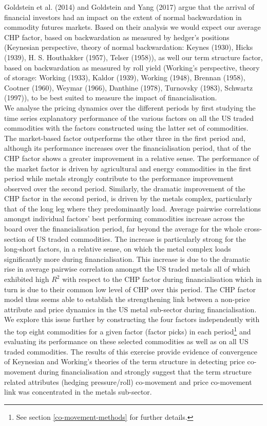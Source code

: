 \documentclass[]{elsarticle} %
\begin{document}
Goldstein et al. (2014) and Goldstein and Yang (2017) argue that the arrival of financial investors had an impact on the extent of normal backwardation in commodity futures markets. Based on their analysis we would expect our average CHP factor, based on backwardation as measured by hedger's positions (Keynesian perspective, theory of normal backwardation: Keynes (1930), Hicks (1939), H. S. Houthakker (1957), Telser (1958)), as well our term structure factor, based on backwardation as measured by roll yield (Working's perspective, theory of storage: Working (1933), Kaldor (1939), Working (1948), Brennan (1958), Cootner (1960), Weymar (1966), Danthine (1978), Turnovsky (1983), Schwartz (1997)), to be best suited to measure the impact of financialisation.\\
We analyse the pricing dynamics over the different periods by first studying the time series explanatory performance of the various factors on all the US traded commodities with the factors constructed using the latter set of commodities. The market-based factor outperforms the other three in the first period and, although its performance increases over the financialisation period, that of the CHP factor shows a greater improvement in a relative sense. The performance of the market factor is driven by agricultural and energy commodities in the first period while metals strongly contribute to the performance improvement observed over the second period. Similarly, the dramatic improvement of the CHP factor in the second period, is driven by the metals complex, particularly that of the long leg where they predominantly load. Average pairwise correlations amongst individual factors' best performing commodities increase across the board over the financialisation period, far beyond the average for the whole cross-section of US traded commodities. The increase is particularly strong for the long-short factors, in a relative sense, on which the metal complex loads significantly more during financialisation. This increase is due to the dramatic rise in average pairwise correlation amongst the US traded metals all of which exhibited high \(R^{2}\) with respect to the CHP factor during financialisation which in turn is due to their common low level of CHP over this period. The CHP factor model thus seems able to establish the strengthening link between a non-price attribute and price dynamics in the US metal sub-sector during financialisation.\\
We explore this issue further by constructing the four factors independently with the top eight commodities for a given factor (factor picks) in each period\footnote{See section \ref{co-movement-methods} for further details.} and evaluating its performance on these selected commodities as well as on all US traded commodities. The results of this exercise provide evidence of convergence of Keynesian and Working's theories of the term structure in detecting price co-movement during financialisation and strongly suggest that the term structure related attributes (hedging pressure/roll) co-movement and price co-movement link was concentrated in the metals sub-sector.
\end{document}
